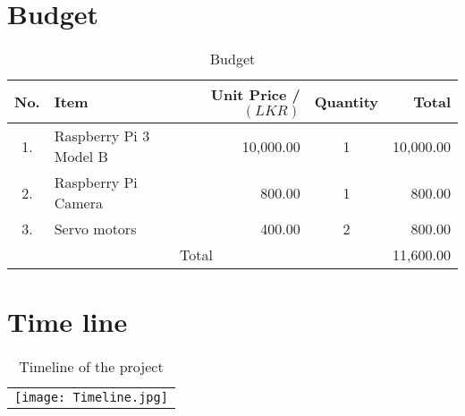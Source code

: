 \documentclass{report}
\begin{document}
\section{Budget}
\begin{table}[h]
    \centering
    \begin{tabular}{|c|l|r|c|r|}
    \hline
         No.    &Item   &Unit Price /$(LKR)$    &Quantity   &Total \\
    \hline
        1.      &   Raspberry Pi 3 Model B   &          10,000.00              &     1      & 10,000.00          \\
        2.      &   Raspberry Pi Camera   &             800.00           &      1     &     800.00      \\
        3.      &   Servo motors   &            400.00            &     2      &    800.00       \\
    \hline
    \multicolumn{4}{|c|}{Total} & 11,600.00\\
    \hline
    \end{tabular}
    \caption{Budget}
    \label{tab:my_label}
\end{table}

\section{Time line}

\begin{table}[H]
    \centering
    \begin{tabular}{c}
        \texttt{[image: Timeline.jpg]}
    \end{tabular}
    \caption{Timeline of the project}
    \label{tab:my_label}
\end{table}
\end{document}
